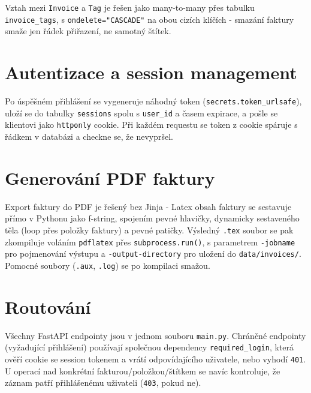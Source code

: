 \documentclass[a4paper,12pt]{article}
\begin{document}
Vztah mezi \texttt{Invoice} a \texttt{Tag} je řešen jako many-to-many přes
 tabulku \texttt{invoice\_tags}, s \texttt{ondelete="CASCADE"} na obou
cizích klíčích - smazání faktury smaže jen řádek přiřazení, ne samotný štítek.

\section{Autentizace a session management}
Po úspěšném přihlášení se vygeneruje náhodný token
(\texttt{secrets.token\_urlsafe}), uloží se do tabulky \texttt{sessions} spolu
s \texttt{user\_id} a časem expirace, a pošle se klientovi jako \texttt{httponly}
cookie. Při každém requestu se token z cookie spáruje s řádkem v databázi a
checkne se, že nevypršel.


\section{Generování PDF faktury}
Export faktury do PDF je řešený bez Jinja - Latex obsah
faktury se sestavuje přímo v Pythonu jako f-string, spojením pevné
hlavičky, dynamicky sestaveného těla (loop přes položky faktury) a pevné
patičky. Výsledný \texttt{.tex} soubor se pak zkompiluje voláním
\texttt{pdflatex} přes \texttt{subprocess.run()}, s parametrem
\texttt{-jobname} pro pojmenování výstupu a \texttt{-output-directory} pro
uložení do \texttt{data/invoices/}. Pomocné soubory (\texttt{.aux},
\texttt{.log}) se po kompilaci smažou.

\section{Routování}
Všechny FastAPI endpointy jsou v jednom souboru \texttt{main.py}. Chráněné
endpointy (vyžadující přihlášení) používají společnou dependency
\texttt{required\_login}, která ověří cookie se session tokenem a vrátí
odpovídajícího uživatele, nebo vyhodí \texttt{401}. U operací nad konkrétní
fakturou/položkou/štítkem se navíc kontroluje, že záznam patří přihlášenému
uživateli (\texttt{403}, pokud ne).
\end{document}
